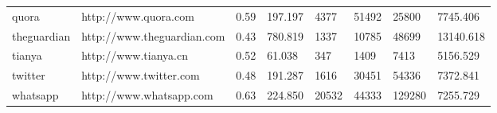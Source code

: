 \begin{table}[]
{\begin{tabular}{|l|l|l|l|l|l|l|l|}
\rowcolor[HTML]{EFEFEF} 
quora             & http://www.quora.com       & 0.59                                                                                & 197.197                                                                           & 4377                                                           & 51492                                                         & 25800                                                                & 7745.406                                                                       \\
theguardian       & http://www.theguardian.com & 0.43                                                                                & 780.819                                                                           & 1337                                                           & 10785                                                         & 48699                                                                & 13140.618                                                                      \\
\rowcolor[HTML]{EFEFEF} 
tianya            & http://www.tianya.cn       & 0.52                                                                                & 61.038                                                                            & 347                                                            & 1409                                                          & 7413                                                                 & 5156.529                                                                       \\
twitter           & http://www.twitter.com     & 0.48                                                                                & 191.287                                                                           & 1616                                                           & 30451                                                         & 54336                                                                & 7372.841                                                                       \\
\rowcolor[HTML]{EFEFEF} 
whatsapp          & http://www.whatsapp.com    & 0.63                                                                                & 224.850                                                                           & 20532                                                          & 44333                                                         & 129280                                                               & 7255.729                                                                       \\

\end{tabular}}
\end{table}
